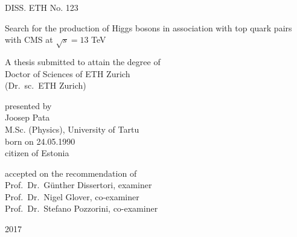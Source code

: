 \documentclass[twoside,openright,titlepage,numbers=noenddot,headinclude,
    footinclude=true,cleardoublepage=empty,
    BCOR=5mm,paper=a4,fontsize=10pt,bibliography=totoc,headings=optiontotocandhead]{scrbook}
\newcommand{\myTitle}{Search for the production of Higgs bosons in association with top quark pairs with CMS at $\sqrt{s}=13$ TeV}
\newcommand{\myDissNumber}{123}
\newcommand{\myName}{Joosep Pata}
\newcommand{\myTime}{2017}
\begin{document}
\begin{titlepage}
    \begin{center}
        \large
        \begingroup
            \large
            DISS. ETH No. \myDissNumber
        \endgroup

        \hfill

        \vfill

        \begingroup
            \Huge{\myTitle}
        \endgroup

        \vfill

        \begingroup
            A thesis submitted to attain the degree of\\
            \vspace{0.5em}
            \Large Doctor of Sciences of ETH Zurich \\
            (Dr.\ sc.\ ETH Zurich)
        \endgroup

        \vfill

        \begingroup
            presented by\\
            \vspace{0.5em}
            \LARGE\myName\\
            \normalsize
            \vspace{0.2em}
            M.Sc. (Physics), University of Tartu \\
            \vspace{0.5em}
            born on 24.05.1990\\
            citizen of Estonia
        \endgroup

        \vfill

        \begingroup
            accepted on the recommendation of\\
            \vspace{0.5em}
            \Large
            Prof.\ Dr.\ G\"unther Dissertori, examiner\\
            Prof.\ Dr.\ Nigel Glover, co-examiner\\
            Prof.\ Dr.\ Stefano Pozzorini, co-examiner\\
        \endgroup

        \vfill

        \myTime%

        \vfill
    \end{center}
\end{titlepage}
\end{document}
